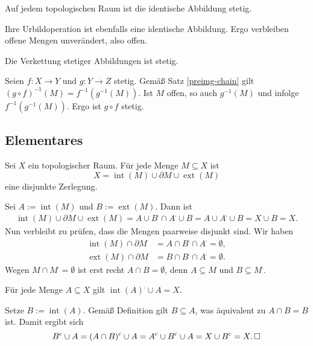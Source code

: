 \begin{Korollar}
Auf jedem topologischen Raum ist die identische Abbildung stetig.
\end{Korollar}
\begin{Beweis}
Ihre Urbildoperation ist ebenfalls eine identische Abbildung. Ergo
verbleiben offene Mengen unverändert, also offen.\,\qedsymbol
\end{Beweis}

\begin{Korollar}
Die Verkettung stetiger Abbildungen ist stetig.
\end{Korollar}
\begin{Beweis}
Seien $f\colon X\to Y$ und $g\colon Y\to Z$ stetig.
Gemäß Satz \ref{preimg-chain} gilt $(g\circ f)^{-1}(M)=f^{-1}(g^{-1}(M))$.
Ist $M$ offen, so auch $g^{-1}(M)$ und infolge $f^{-1}(g^{-1}(M))$.
Ergo ist $g\circ f$ stetig.\,\qedsymbol
\end{Beweis}

\newpage
\subsection{Elementares}

\begin{Korollar}\label{partition-int-bd-ext}
Sei $X$ ein topologischer Raum. Für jede Menge $M\subseteq X$ ist%
\[X = \operatorname{int}(M)\cup\partial M\cup\operatorname{ext}(M)\]
eine disjunkte Zerlegung.
\end{Korollar}
\begin{Beweis} Sei $A:=\operatorname{int}(M)$ und $B:=\operatorname{ext}(M)$. Dann ist
\begin{gather*}
\operatorname{int}(M)\cup\partial M\cup\operatorname{ext}(M)
= A\cup B^\comp\cap A^\comp\cup B
= A\cup A^\comp\cup B = X\cup B = X.
\end{gather*}
Nun verbleibt zu prüfen, dass die Mengen paarweise disjunkt sind. Wir haben%
\begin{align*}
\operatorname{int}(M)\cap\partial M &= A\cap B^\comp\cap A^\comp = \emptyset,\\
\operatorname{ext}(M)\cap\partial M &= B\cap B^\comp\cap A^\comp = \emptyset.
\end{align*}
Wegen $M\cap M^\comp=\emptyset$ ist erst recht $A\cap B=\emptyset$,
denn $A\subseteq M$ und $B\subseteq M^\comp$.\,\qedsymbol
\end{Beweis}

\begin{Korollar}
Für jede Menge $A\subseteq X$ gilt $\operatorname{int}(A)^\comp\cup A = X$.
\end{Korollar}
\begin{Beweis}
Setze $B:=\operatorname{int}(A)$. Gemäß Definition gilt $B\subseteq A$,
was äquivalent zu $A\cap B = B$ ist. Damit ergibt sich
\[B^\mathrm c\cup A = (A\cap B)^\mathrm c\cup A = A^\mathrm c\cup B^\mathrm c\cup A
= X\cup B^\mathrm c = X.\,\square\]
\end{Beweis}

